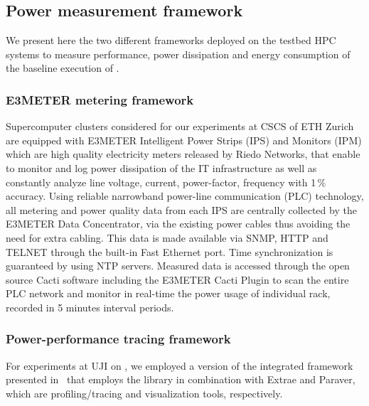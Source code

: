 \subsection{Power measurement framework}
\label{subsec:3.3}

We present here  the two different frameworks deployed  on the testbed
HPC  systems  to measure  performance,  power  dissipation and  energy
consumption of the baseline execution of \cosmoart.

\subsubsection{E3METER metering framework}

Supercomputer clusters  considered for our experiments at  CSCS of ETH
Zurich are  equipped with E3METER  Intelligent Power Strips  (IPS) and
Monitors (IPM)  which are high quality electricity  meters released by
Riedo Networks,  that enable to  monitor and log power  dissipation of
the  IT infrastructure  as well  as constantly  analyze  line voltage,
current, power-factor, frequency  with 1\,\% accuracy.  Using reliable
narrowband power-line communication (PLC) technology, all metering and
power  quality data  from  each  IPS are  centrally  collected by  the
E3METER Data Concentrator, via the existing power cables thus avoiding
the need  for extra  cabling.  This data  is made available  via SNMP,
HTTP  and  TELNET  through  the  built-in Fast  Ethernet  port.   Time
synchronization is guaranteed by  using NTP servers.  Measured data is
accessed through the open  source Cacti software including the E3METER
Cacti Plugin to  scan the entire PLC network  and monitor in real-time
the power  usage of  individual rack, recorded  in 5  minutes interval
periods.

\subsubsection{Power-performance tracing framework}

For  experiments  at UJI  on  \tinto, we  employed  a  version of  the
integrated  framework presented  in~\cite{energy13}  that employs  the
\pmlib  library in  combination  with Extrae  and  Paraver, which  are
profiling/tracing and visualization tools, respectively.

